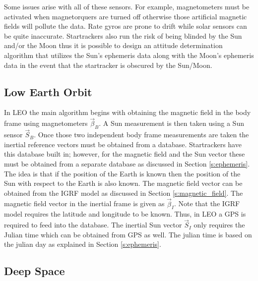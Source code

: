 \documentclass{article}
\begin{document}
Some issues arise with all of these sensors. For example,
magnetometers must be activated when magnetorquers are turned off
otherwise those artificial magnetic fields will pollute the data. Rate
gyros are prone to drift while solar sensors can be quite
inaccurate. Startrackers also run the risk of being blinded by the Sun
and/or the Moon thus it is possible to design an
attitude determination algorithm that utilizes the Sun's ephemeris data
along with the Moon's ephemeris data in the event that the startracker
is obscured by the Sun/Moon.

\subsection{Low Earth Orbit}

In LEO the main algorithm begins with obtaining the magnetic field in
the body frame using magnetometers $\vec{\beta}_B$. A Sun measurement is
then taken using a Sun sensor $\vec{S}_B$. Once those two independent
body frame measurements are taken the inertial reference vectors must
be obtained from a database. Startrackers have this database built in;
however, for the magnetic field and the Sun vector these must be
obtained from a separate database as discussed in Section
\ref{s:ephemeris}. The idea is that if the position of the Earth is
known then the position of the Sun with respect to the Earth is also
known. The magnetic field vector can be 
obtained from the IGRF model as discussed in Section
\ref{s:magnetic_field}. The magnetic field vector in the inertial
frame is given as $\vec{\beta}_I$. Note that the IGRF model requires
the latitude and longitude to be known. Thus, in LEO a GPS is required
to feed into the database. The inertial Sun vector $\vec{S}_I$ only
requires the Julian time which can be obtained from GPS as well. The julian time is
based on the julian day as explained in Section \ref{s:ephemeris}. 

\subsection{Deep Space}
\end{document}
